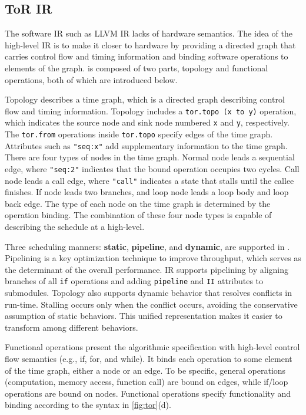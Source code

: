 \subsection{ToR IR} \label{sec:tor}
The software IR such as LLVM IR lacks of hardware semantics. The idea of the high-level IR is to make it closer to hardware by providing a directed graph that carries control flow and timing information and binding software operations to elements of the graph. \tor is composed of two parts, topology and functional operations, both of which are introduced below. 

Topology describes a time graph, which is a directed graph describing control flow and timing information. Topology includes a \verb|tor.topo (x to y)| operation, which indicates the source node and sink node numbered \verb|x| and \verb|y|, respectively. The \verb|tor.from| operations inside \verb|tor.topo| specify edges of the time graph. Attributes such as \verb|"seq:x"| add supplementary information to the time graph. There are four types of nodes in the time graph. Normal node leads a sequential edge, where \verb|"seq:2"| indicates that the bound operation occupies two cycles. Call node leads a call edge, where \verb|"call"| indicates a state that stalls until the callee finishes. If node leads two branches, and loop node leads a loop body and loop back edge. The type of each node on the time graph is determined by the operation binding. The combination of these four node types is capable of describing the schedule at a high-level.

Three scheduling manners: \textbf{static}, \textbf{pipeline}, and \textbf{dynamic}, are supported in \tor. Pipelining is a key optimization technique to improve throughput, which serves as the determinant of the overall performance. \tor IR supports pipelining by aligning branches of all \verb|if| operations and adding \verb|pipeline| and \verb|II| attributes to submodules. Topology also supports dynamic behavior that resolves conflicts in run-time. Stalling occurs only when the conflict occurs, avoiding the conservative assumption of static behaviors. This unified representation makes it easier to transform among different behaviors. 

Functional operations present the algorithmic specification with high-level control flow semantics (e.g., if, for, and while). It binds each operation to some element of the time graph, either a node or an edge. To be specific, general operations (computation, memory access, function call) are bound on edges, while if/loop operations are bound on nodes. Functional operations specify functionality and binding according to the syntax in \autoref{fig:tor}(d). 

